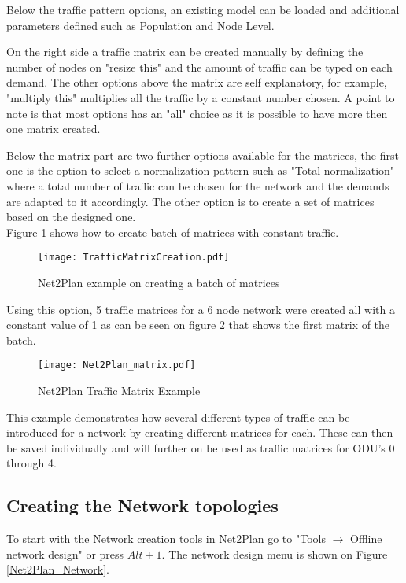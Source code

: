 \documentclass[12pt, a4paper]{article}
\begin{document}
	Below the traffic pattern options, an existing model can be loaded and additional parameters defined such as Population and Node Level.
	
	On the right side a traffic matrix can be created manually by defining the number of nodes on "resize this" and the amount of traffic can be typed on each demand. The other options above the matrix are self explanatory, for example, "multiply this" multiplies all the traffic by a constant number chosen. A point to note is that most options has an "all" choice as it is possible to have more then one matrix created.
	
	Below the matrix part are two further options available for the matrices, the first one is the option to select a normalization pattern such as "Total normalization" where a total number of traffic can be chosen for the network and the demands are adapted to it accordingly. The other option is to create a set of matrices based on the designed one.\\
	
	Figure \ref{TrafficMatrixCreation} shows how to create batch of matrices with constant traffic.
	
	\begin{figure}[h!]
		\centering
		\texttt{[image: TrafficMatrixCreation.pdf]}
		\caption{Net2Plan example on creating a batch of matrices }
		\label{TrafficMatrixCreation}
	\end{figure} 	
	
	Using this option, 5 traffic matrices for a 6 node network were created all with a constant value of 1 as can be seen on figure \ref{Net2Plan_matrix} that shows the first matrix of the batch.

	\begin{figure}[h!]
		\centering
		\texttt{[image: Net2Plan\_matrix.pdf]}
		\caption{Net2Plan Traffic Matrix Example}
		\label{Net2Plan_matrix}
	\end{figure}
	
	This example demonstrates how several different types of traffic can be introduced for a network by creating different matrices for each. These can then be saved individually and will further on be used as traffic matrices for ODU's 0 through 4.
	
	\newpage
		
	\subsection{Creating the Network topologies} \label{Creating the Network topologies}
	To start with the Network creation tools in Net2Plan go to "Tools $\rightarrow$ Offline network design" or press $Alt+1$. The network design menu is shown on Figure \ref{Net2Plan_Network}.
	
\end{document}
